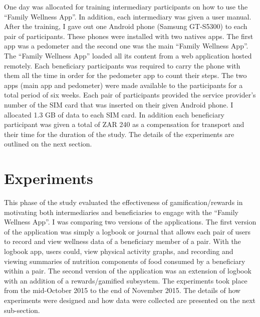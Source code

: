 One day was allocated for training intermediary participants on how to use the ``Family Wellness App''. In addition, each intermediary was given a user manual. After the training, I gave out one Android phone (Samsung GT-S5300) to each pair of participants. These phones were installed with two natives apps. The first app was a pedometer and the second one was the main ``Family Wellness App''. The ``Family Wellness App'' loaded all its content from a web application hosted remotely. Each beneficiary participants was required to carry the phone with them all the time in order for the pedometer app to count their steps. The two apps (main app and pedometer) were made available to the participants for a total period of six weeks. Each pair of participants provided the service provider's number of the SIM card that was inserted on their given Android phone. I allocated 1.3 GB of data to each SIM card. In addition each beneficiary participant was given a total of ZAR 240 as a compensation for transport and their time for the duration of the study. The details of the experiments are outlined on the next section.
\section{Experiments}
This phase of the study evaluated the effectiveness of gamification/rewards in motivating both intermediaries and beneficiaries to engage with the ``Family Wellness App''. I was comparing two versions of the applications. The first version of the application was simply a logbook or journal that allows each pair of users to record and view wellness data of a beneficiary member of a pair. With the logbook app, users could, view physical activity graphs, and recording and viewing summaries of nutrition components of food consumed by a beneficiary within a pair. The second version of the application was an extension of logbook  with an addition of a rewards/gamified subsystem. The experiments took place from the mid-October 2015 to the end of November 2015.  The details of how experiments were designed and how data were collected are presented on the next sub-section.

